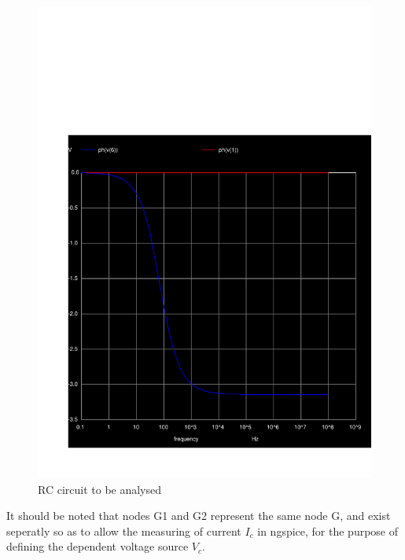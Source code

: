     \begin{figure}[H] \centering
        \includegraphics[width=1\linewidth]{../sim/phase5.pdf}
        \caption{RC circuit to be analysed}
        \label{fig:t2}
        \end{figure}

It should be noted that nodes G1 and G2 represent the same node G, and exist seperatly
so as to allow the measuring of current $I_c$ in ngspice, for the purpose of defining the
dependent voltage source $V_c$.

